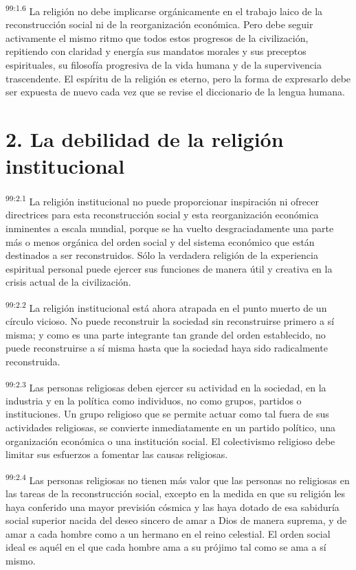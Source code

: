 \par
\textsuperscript{99:1.6} La religión no debe implicarse orgánicamente en el trabajo laico de la reconstrucción social ni de la reorganización económica. Pero debe seguir activamente el mismo ritmo que todos estos progresos de la civilización, repitiendo con claridad y energía sus mandatos morales y sus preceptos espirituales, su filosofía progresiva de la vida humana y de la supervivencia trascendente. El espíritu de la religión es eterno, pero la forma de expresarlo debe ser expuesta de nuevo cada vez que se revise el diccionario de la lengua humana.

\section*{2. La debilidad de la religión institucional}
\par
\textsuperscript{99:2.1} La religión institucional no puede proporcionar inspiración ni ofrecer directrices para esta reconstrucción social y esta reorganización económica inminentes a escala mundial, porque se ha vuelto desgraciadamente una parte más o menos orgánica del orden social y del sistema económico que están destinados a ser reconstruidos. Sólo la verdadera religión de la experiencia espiritual personal puede ejercer sus funciones de manera útil y creativa en la crisis actual de la civilización.

\par
\textsuperscript{99:2.2} La religión institucional está ahora atrapada en el punto muerto de un círculo vicioso. No puede reconstruir la sociedad sin reconstruirse primero a sí misma; y como es una parte integrante tan grande del orden establecido, no puede reconstruirse a sí misma hasta que la sociedad haya sido radicalmente reconstruida.

\par
\textsuperscript{99:2.3} Las personas religiosas deben ejercer su actividad en la sociedad, en la industria y en la política como individuos, no como grupos, partidos o instituciones. Un grupo religioso que se permite actuar como tal fuera de sus actividades religiosas, se convierte inmediatamente en un partido político, una organización económica o una institución social. El colectivismo religioso debe limitar sus esfuerzos a fomentar las causas religiosas.

\par
\textsuperscript{99:2.4} Las personas religiosas no tienen más valor que las personas no religiosas en las tareas de la reconstrucción social, excepto en la medida en que su religión les haya conferido una mayor previsión cósmica y las haya dotado de esa sabiduría social superior nacida del deseo sincero de amar a Dios de manera suprema, y de amar a cada hombre como a un hermano en el reino celestial. El orden social ideal es aquél en el que cada hombre ama a su prójimo tal como se ama a sí mismo.

